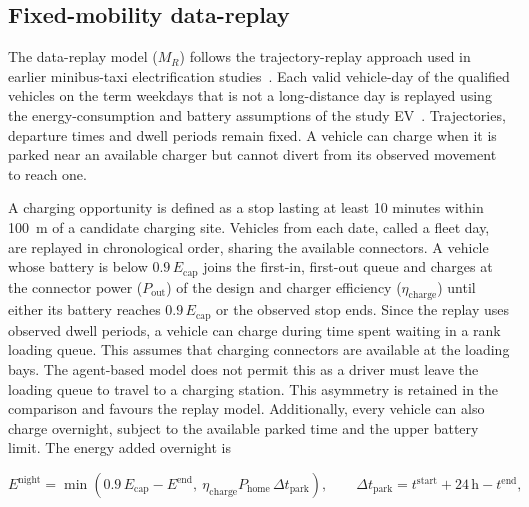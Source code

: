 \documentclass{elsarticle}
\newcommand{\MR}{\ensuremath{M_R}}
\begin{document}
\subsection{Fixed-mobility data-replay}
\label{sec:replay}

The data-replay model (\(\MR\)) follows the trajectory-replay approach used in earlier minibus-taxi electrification studies~\cite{pretorius2024_grid_mobility_interdependence,booysen2026_cpt_embt_transition}. Each valid vehicle-day of the qualified vehicles on the term weekdays that is not a long-distance day is replayed using the energy-consumption and battery assumptions of the study EV~\cite{sello2026_ekamva_performance, higer_h5c_ev_2022}. Trajectories, departure times and dwell periods remain fixed. A vehicle can charge when it is parked near an available charger but cannot divert from its observed movement to reach one.

A charging opportunity is defined as a stop lasting at least 10 minutes within 100~m of a candidate charging site. Vehicles from each date, called a fleet day, are replayed in chronological order, sharing the available connectors. A vehicle whose battery is below \(0.9\,E_\mathrm{cap}\) joins the first-in, first-out queue and charges at the connector power (\( P_\mathrm{out} \)) of the design and charger efficiency (\( \eta_\mathrm{charge} \)) until either its battery reaches \(0.9\,E_\mathrm{cap}\) or the observed stop ends. Since the replay uses observed dwell periods, a vehicle can charge during time spent waiting in a rank loading queue. This assumes that charging connectors are available at the loading bays. The agent-based model does not permit this as a driver must leave the loading queue to travel to a charging station. This asymmetry is retained in the comparison and favours the replay model. Additionally, every vehicle can also charge overnight, subject to the available parked time and the upper battery limit. The energy added overnight is

\begin{equation}
    E^{\text{night}} = \min\left(0.9\,E_\mathrm{cap} - E^{\text{end}},\ \eta_\mathrm{charge} P_\mathrm{home}\, \Delta t_{\text{park}}\right), \qquad \Delta t_{\text{park}} = t^{\text{start}} + 24\,\text{h} - t^{\text{end}},
    \label{eq:overnight}
\end{equation}
\end{document}
